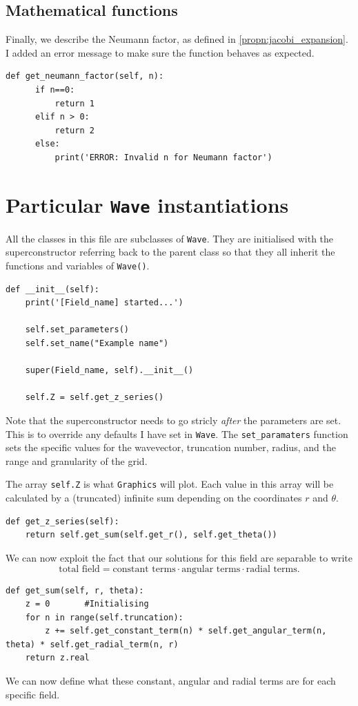 \subsection{Mathematical functions}
%
Finally, we describe the Neumann factor, as defined in \ref{propn:jacobi_expansion}. I added an error message to make sure the function behaves as expected.
  \begin{lstlisting}
def get_neumann_factor(self, n):
      if n==0:
          return 1
      elif n > 0:
          return 2
      else:
          print('ERROR: Invalid n for Neumann factor')\end{lstlisting}
%
\section{Particular \texttt{Wave} instantiations}
%
All the classes in this file are subclasses of \verb!Wave!. They are initialised with the superconstructor referring back to the parent class so that they all inherit the functions and variables of \verb!Wave()!.
%
  \begin{lstlisting}
def __init__(self):
    print('[Field_name] started...')

    self.set_parameters()
    self.set_name("Example name")

    super(Field_name, self).__init__()

    self.Z = self.get_z_series()\end{lstlisting}\par
%
Note that the superconstructor needs to go stricly \textit{after} the parameters are set. This is to override any defaults I have set in \verb!Wave!. The \verb!set_paramaters! function sets the specific values for the wavevector, truncation number, radius, and the range and granularity of the grid. \par
%
The array \verb!self.Z! is what \verb!Graphics! will plot. Each value in this array will be calculated by a (truncated) infinite sum depending on the coordinates $r$ and $\theta$.
%
  \begin{lstlisting}
def get_z_series(self):
    return self.get_sum(self.get_r(), self.get_theta()) \end{lstlisting}
%
We can now exploit the fact that our solutions for this field are separable to write
  \begin{equation}
    \text{total field} = \text{constant terms} \cdot \text{angular terms} \cdot \text{radial terms}.
  \end{equation}\par
%
  \begin{lstlisting}
def get_sum(self, r, theta):
    z = 0       #Initialising
    for n in range(self.truncation):
        z += self.get_constant_term(n) * self.get_angular_term(n, theta) * self.get_radial_term(n, r)
    return z.real   \end{lstlisting}\par
%
We can now define what these constant, angular and radial terms are for each specific field.
%
